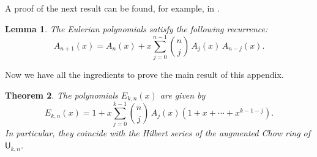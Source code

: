 \documentclass[11pt, a4paper, english]{amsart}
\theoremstyle{teoremas}
\newtheorem{theorem}{Theorem}[section]
\newtheorem{lemma}[theorem]{Lemma}
\theoremstyle{definition}
\newcommand{\U}{\mathsf{U}}
\begin{document}
A proof of the next result can be found, for example, in \cite[Theorem~1.5]{petersen}.

\begin{lemma}\label{lemma:recursion-quadratic-eulerian}
    The Eulerian polynomials satisfy the following recurrence:
    \[ A_{n+1}(x) = A_n(x) +x \sum_{j=0}^{n-1} \binom{n}{j}\, A_j(x)\, A_{n-j}(x).\] 
\end{lemma}

Now we have all the ingredients to prove the main result of this appendix.

\begin{theorem}
    The polynomials $E_{k,n}(x)$ are given by
    \[E_{k,n}(x) = 1 + x\sum_{j=0}^{k-1} \binom{n}{j}\, A_j(x) (1+x+\cdots+x^{k-1-j}).\]
    In particular, they coincide with the Hilbert series of the augmented Chow ring of $\U_{k,n}$.
\end{theorem}
\end{document}

